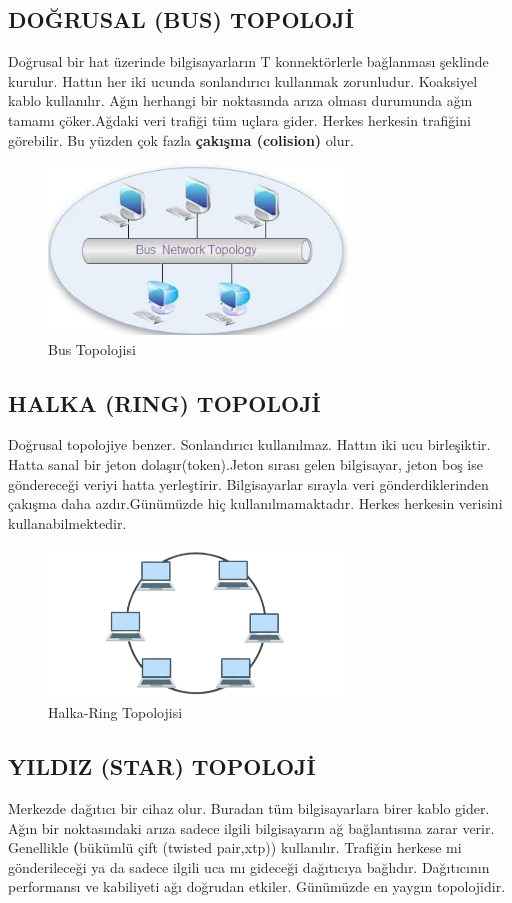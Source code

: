 \subsection*{DOĞRUSAL (BUS) TOPOLOJİ}
Doğrusal bir hat üzerinde bilgisayarların T konnektörlerle bağlanması şeklinde kurulur. Hattın her iki ucunda sonlandırıcı kullanmak zorunludur. Koaksiyel kablo kullanılır. Ağın herhangi  bir noktasında arıza olması durumunda ağın tamamı çöker.Ağdaki veri trafiği tüm uçlara gider. Herkes herkesin trafiğini görebilir. Bu yüzden çok fazla \textbf{çakışma (colision)} olur.
\begin{figure}[H]
    \centering
    \includegraphics[width=8cm]{images/bus-topolojisi}
    \caption{Bus Topolojisi}
    \label{fig:bustopolojisi}
\end{figure}
\subsection*{HALKA (RING) TOPOLOJİ}
Doğrusal topolojiye benzer. Sonlandırıcı kullanılmaz. Hattın iki ucu birleşiktir. Hatta sanal  bir jeton dolaşır(token).Jeton sırası gelen bilgisayar, jeton boş ise göndereceği veriyi hatta yerleştirir.
Bilgisayarlar sırayla veri gönderdiklerinden çakışma daha azdır.Günümüzde hiç kullanılmamaktadır. Herkes herkesin verisini kullanabilmektedir.
\begin{figure}[H]
    \centering
    \includegraphics[width=8cm]{images/ring-topology-removebg-preview}
    \caption{Halka-Ring Topolojisi}
    \label{fig:halka_topolojisi}
\end{figure}

\subsection*{YILDIZ (STAR) TOPOLOJİ}
Merkezde dağıtıcı bir cihaz olur.
Buradan tüm bilgisayarlara birer kablo gider.
Ağın bir noktasındaki arıza sadece ilgili bilgisayarın ağ bağlantısına zarar verir.
Genellikle \textbf(bükümlü çift (twisted pair,xtp)) kullanılır.
Trafiğin herkese mi gönderileceği ya da sadece ilgili uca mı gideceği dağıtıcıya bağlıdır.
Dağıtıcının performansı ve kabiliyeti ağı doğrudan etkiler.
Günümüzde en yaygın topolojidir.


